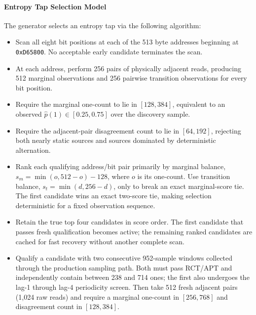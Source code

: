 \documentclass[titlepage]{report}
\begin{document}
	\paragraph{Entropy Tap Selection Model}
	The generator selects an entropy tap via the following algorithm:
	\begin{itemize}
		\item Scan all eight bit positions at each of the 513 byte addresses beginning at \texttt{0xD65800}. No acceptable early candidate terminates the scan.
		\item At each address, perform 256 pairs of physically adjacent reads, producing 512 marginal observations and 256 pairwise transition observations for every bit position.
		\item Require the marginal one-count to lie in $[128,384]$, equivalent to an observed $\hat p(1)\in[0.25,0.75]$ over the discovery sample.
		\item Require the adjacent-pair disagreement count to lie in $[64,192]$, rejecting both nearly static sources and sources dominated by deterministic alternation.
		\item Rank each qualifying address/bit pair primarily by marginal balance, $s_m=\min(o,512-o)-128$, where $o$ is its one-count. Use transition balance, $s_t=\min(d,256-d)$, only to break an exact marginal-score tie. The first candidate wins an exact two-score tie, making selection deterministic for a fixed observation sequence.
		\item Retain the true top four candidates in score order. The first candidate that passes fresh qualification becomes active; the remaining ranked candidates are cached for fast recovery without another complete scan.
		\item Qualify a candidate with two consecutive 952-sample windows collected through the production sampling path. Both must pass RCT/APT and independently contain between 238 and 714 ones; the first also undergoes the lag-1 through lag-4 periodicity screen. Then take 512 fresh adjacent pairs (1,024 raw reads) and require a marginal one-count in $[256,768]$ and disagreement count in $[128,384]$.
	\end{itemize}
	
\end{document}
